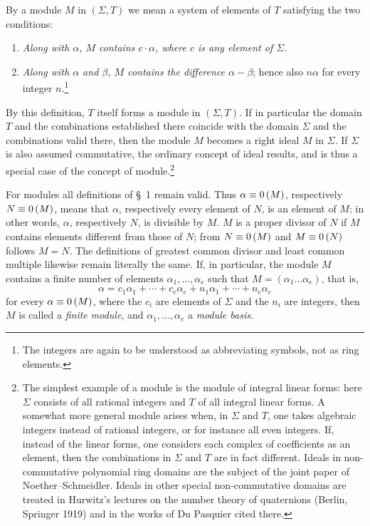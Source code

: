 \documentclass[11pt]{article}
\begin{document}
By a module $M$ in $(\Sigma,T)$ we mean a system of elements of $T$ satisfying the two conditions:
\begin{enumerate}
\item \emph{Along with $\alpha$, $M$ contains $c\cdot\alpha$, where $c$ is any element of $\Sigma$.}
\item \emph{Along with $\alpha$ and $\beta$, $M$ contains the difference $\alpha-\beta$}; hence also $n\alpha$ for every integer $n$.\footnote{The integers are again to be understood as abbreviating symbols, not as ring elements.}
\end{enumerate}
By this definition, $T$ itself forms a module in $(\Sigma,T)$. If in particular the domain $T$ and the combinations established there coincide with the domain $\Sigma$ and the combinations valid there, then the module $M$ becomes a right ideal $M$ in $\Sigma$. If $\Sigma$ is also assumed commutative, the ordinary concept of ideal results, and is thus a special case of the concept of module.\footnote{The simplest example of a module is the module of integral linear forms: here $\Sigma$ consists of all rational integers and $T$ of all integral linear forms. A somewhat more general module arises when, in $\Sigma$ and $T$, one takes algebraic integers instead of rational integers, or for instance all even integers. If, instead of the linear forms, one considers each complex of coefficients as an element, then the combinations in $\Sigma$ and $T$ are in fact different. Ideals in non-commutative polynomial ring domains are the subject of the joint paper of Noether--Schmeidler. Ideals in other special non-commutative domains are treated in Hurwitz's lectures on the number theory of quaternions (Berlin, Springer 1919) and in the works of Du Pasquier cited there.}

For modules all definitions of \S~1 remain valid. Thus $\alpha\equiv 0\,(M)$, respectively $N\equiv 0\,(M)$, means that $\alpha$, respectively every element of $N$, is an element of $M$; in other words, $\alpha$, respectively $N$, is divisible by $M$. $M$ is a proper divisor of $N$ if $M$ contains elements different from those of $N$; from $N\equiv 0\,(M)$ and $M\equiv 0\,(N)$ follows $M=N$. The definitions of greatest common divisor and least common multiple likewise remain literally the same. If, in particular, the module $M$ contains a finite number of elements $\alpha_1,\ldots,\alpha_e$ such that $M=(\alpha_1\ldots\alpha_e)$, that is,
\[
 \alpha=c_1\alpha_1+\cdots+c_e\alpha_e+n_1\alpha_1+\cdots+n_e\alpha_e
\]
for every $\alpha\equiv 0\,(M)$, where the $c_i$ are elements of $\Sigma$ and the $n_i$ are integers, then $M$ is called a \emph{finite module}, and $\alpha_1,\ldots,\alpha_e$ a \emph{module basis}.
\end{document}
